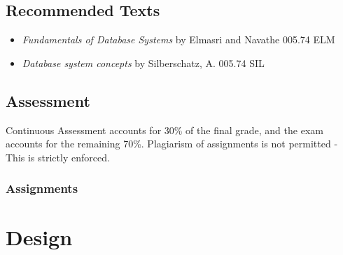 \documentclass[a4paper,11pt]{article}
\begin{document}
\subsection{Recommended Texts}
\begin{itemize}
    \item   \emph{Fundamentals of Database Systems} by Elmasri and Navathe 005.74 ELM
    \item   \emph{Database system concepts} by Silberschatz, A. 005.74 SIL
\end{itemize}

\subsection{Assessment}
Continuous Assessment accounts for 30\% of the final grade, and the exam accounts for the remaining 70\%.
Plagiarism of assignments is not permitted - This is strictly enforced.

\subsubsection{Assignments}

\section{Design}
\end{document}
